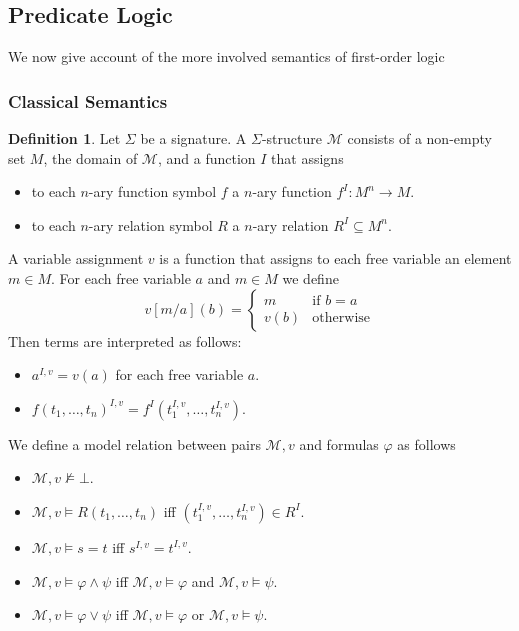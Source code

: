 \documentclass[a4paper,11pt]{report}
\theoremstyle{definition}
\theoremstyle{definition}
\theoremstyle{definition}
\theoremstyle{definition}
\theoremstyle{definition}
\newtheorem{definition}[theorem]{Definition}
\theoremstyle{definition}
\theoremstyle{definition}
\begin{document}
	
	\subsection{Predicate Logic}

	We now give account of the more involved semantics of first-order logic
	
	\subsubsection{Classical Semantics}

	\begin{definition}
		Let $\Sigma$ be a signature. A $\Sigma$-structure $\mathcal{M}$ consists of a non-empty set $M$, the domain of $\mathcal{M}$, and a function $I$ that assigns
		\begin{itemize}
			\item to each $n$-ary function symbol $f$ a $n$-ary function $f^I: M^n\to M$.
			\item to each $n$-ary relation symbol $R$ a $n$-ary relation $R^I\subseteq M^n$.
		\end{itemize}
		A variable assignment $v$ is a function that assigns to each free variable an element $m\in M$. For each free variable $a$ and $m\in M$ we define $$v[m/a](b) = \begin{cases}
			m&\text{if $b=a$}\\
			v(b)&\text{otherwise}
		\end{cases}$$
		Then terms are interpreted as follows:
		\begin{itemize}
			\item $a^{I, v} = v(a)$ for each free variable $a$.
			\item $f(t_1,\dots,t_n)^{I, v} = f^I(t_1^{I, v},\dots, t_n^{I, v})$.
		\end{itemize}
		We define a model relation between pairs $\mathcal M, v$ and formulas $\varphi$ as follows
		\begin{itemize}
			\item $\mathcal M, v\not\models\bot$.
			\item $\mathcal M, v\models R(t_1,\dots,t_n)$ iff $(t_1^{I, v},\dots,t_n^{I, v})\in R^I$.
			\item $\mathcal M, v\models s = t$ iff $s^{I, v} = t^{I, v}$.
			\item $\mathcal M, v\models \varphi\wedge \psi$ iff $\mathcal M, v\models\varphi$ and $\mathcal M, v\models\psi$.
			\item $\mathcal M, v\models \varphi\vee\psi$ iff $\mathcal M, v\models\varphi$ or $\mathcal M, v\models\psi$.

\end{itemize}
\end{definition}
\end{document}
